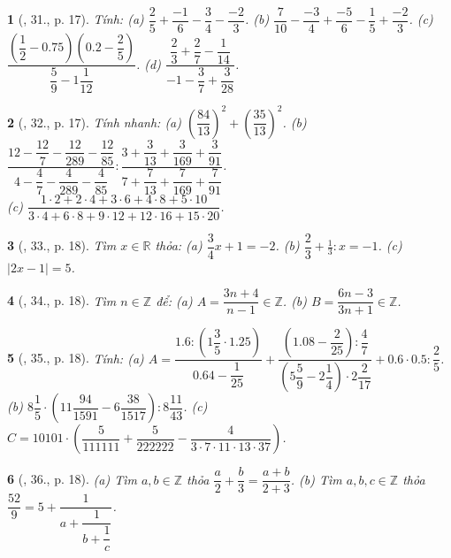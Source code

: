 \documentclass{article}
\newtheorem{baitoan}{}
\begin{document}
\begin{baitoan}[\cite{Binh_Toan_6_tap_2}, 31., p. 17]
	Tính: (a) $\dfrac{2}{5} + \dfrac{-1}{6} - \dfrac{3}{4} - \dfrac{-2}{3}$. (b) $\dfrac{7}{10} - \dfrac{-3}{4} + \dfrac{-5}{6} - \dfrac{1}{5} + \dfrac{-2}{3}$. (c) $\dfrac{\left(\dfrac{1}{2} - 0.75\right)\left(0.2 - \dfrac{2}{5}\right)}{\dfrac{5}{9} - 1\dfrac{1}{12}}$. (d) $\dfrac{\dfrac{2}{3} + \dfrac{2}{7} - \dfrac{1}{14}}{-1 - \dfrac{3}{7} + \dfrac{3}{28}}$.
\end{baitoan}

\begin{baitoan}[\cite{Binh_Toan_6_tap_2}, 32., p. 17]
	Tính nhanh: (a) $\left(\dfrac{84}{13}\right)^2 + \left(\dfrac{35}{13}\right)^2$. (b) $\dfrac{12 - \dfrac{12}{7} - \dfrac{12}{289} - \dfrac{12}{85}}{4 - \dfrac{4}{7} - \dfrac{4}{289} - \dfrac{4}{85}}:\dfrac{3 + \dfrac{3}{13} + \dfrac{3}{169} + \dfrac{3}{91}}{7 + \dfrac{7}{13} + \dfrac{7}{169} + \dfrac{7}{91}}$.\\(c) $\dfrac{1\cdot2 + 2\cdot4 + 3\cdot6 + 4\cdot8 + 5\cdot10}{3\cdot4 + 6\cdot8 + 9\cdot12 + 12\cdot16 + 15\cdot20}$.
\end{baitoan}

\begin{baitoan}[\cite{Binh_Toan_6_tap_2}, 33., p. 18]
	Tìm $x\in\mathbb{R}$ thỏa: (a) $\dfrac{3}{4}x + 1 = -2$. (b) $\dfrac{2}{3} + \frac{1}{3}:x = -1$. (c) $|2x - 1| = 5$.
\end{baitoan}

\begin{baitoan}[\cite{Binh_Toan_6_tap_2}, 34., p. 18]
	Tìm $n\in\mathbb{Z}$ để: (a) $A = \dfrac{3n + 4}{n - 1}\in\mathbb{Z}$. (b) $B = \dfrac{6n - 3}{3n + 1}\in\mathbb{Z}$.
\end{baitoan}

\begin{baitoan}[\cite{Binh_Toan_6_tap_2}, 35., p. 18]
	Tính: (a) $A = \dfrac{1.6:\left(1\dfrac{3}{5}\cdot1.25\right)}{0.64 - \dfrac{1}{25}} + \dfrac{\left(1.08 - \dfrac{2}{25}\right):\dfrac{4}{7}}{\left(5\dfrac{5}{9} - 2\dfrac{1}{4}\right)\cdot2\dfrac{2}{17}} + 0.6\cdot0.5:\dfrac{2}{5}$. (b) $8\dfrac{1}{5}\cdot\left(11\dfrac{94}{1591} - 6\dfrac{38}{1517}\right):8\dfrac{11}{43}$. (c) $C = 10101\cdot\left(\dfrac{5}{111111} + \dfrac{5}{222222} - \dfrac{4}{3\cdot7\cdot11\cdot13\cdot37}\right)$.
\end{baitoan}

\begin{baitoan}[\cite{Binh_Toan_6_tap_2}, 36., p. 18]
	(a) Tìm $a,b\in\mathbb{Z}$ thỏa $\dfrac{a}{2} + \dfrac{b}{3} = \dfrac{a + b}{2 + 3}$. (b) Tìm $a,b,c\in\mathbb{Z}$ thỏa $\dfrac{52}{9} = 5 + \dfrac{1}{a + \dfrac{1}{b + \dfrac{1}{c}}}$.
\end{baitoan}
\end{document}
